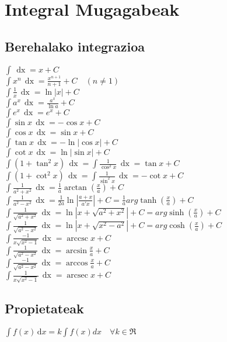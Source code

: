 \documentclass{article}
\DeclareMathOperator{\xder}{\, \mathrm{d}x}
\DeclareMathOperator{\arccsc}{arccsc}
\DeclareMathOperator{\arcsec}{arcsec}
\begin{document}
	\section{Integral Mugagabeak}
		\subsection{Berehalako integrazioa}
			$ \int \xder = x + C $\\
			$ \int x^n \xder = \frac{x^{n+1}}{n+1} + C \quad (n \neq 1) $\\
			$ \int \frac{1}{x} \xder = \ln |x| + C $\\
			$ \int a^x \xder = \frac{a^x}{\ln a} + C $\\
			$ \int e^x \xder = e^x + C $\\
			$ \int \sin x \xder = - \cos x + C $\\
			$ \int \cos x \xder = \sin x + C $\\
			$ \int \tan x \xder = -\ln |\cos x| + C $\\
			$ \int \cot x \xder = \ln |\sin x| + C $\\
			$ \int (1 + \tan^2 x) \xder = \int \frac{1}{\cos^2 x} \xder = \tan x + C $\\
			$ \int (1 + \cot^2 x) \xder = \int \frac{1}{\sin^2 x} \xder = -\cot x + C $\\
			$ \int \frac{1}{a^2 + x^2} \xder = \frac{1}{a} \arctan (\frac{x}{a}) + C $\\
			$ \int \frac{1}{a^2 - x^2} \xder = \frac{1}{2a} \ln |\frac{a+x}{a'x}| + C = \frac{1}{a} arg \tanh (\frac{x}{a}) + C $\\
			$ \int \frac{1}{\sqrt{a^2 + x^2}} \xder = \ln |x + \sqrt{a^2 + x^2}| + C = arg \sinh (\frac{x}{a}) + C $\\
			$ \int \frac{1}{\sqrt{a^2 - x^2}} \xder = \ln |x + \sqrt{x^2 - a^2}| + C = arg \cosh (\frac{x}{a}) + C $\\
			$ \int \frac{-1}{x \sqrt{x^2 - 1}} \xder = \arccsc x + C $\\
			$ \int \frac{1}{\sqrt{a^2 - x^2}} \xder = \arcsin \frac{x}{a} + C $\\
			$ \int \frac{-1}{\sqrt{a^2 - x^2}} \xder = \arccos \frac{x}{a} + C $\\
			$ \int \frac{1}{x\sqrt{x^2 - 1}} \xder = \arcsec x + C $\\

			\subsection{Propietateak}
				$\int f(x) \, \mathrm{d}x = k \int f(x) dx \quad \forall k \in \Re$
\end{document}
